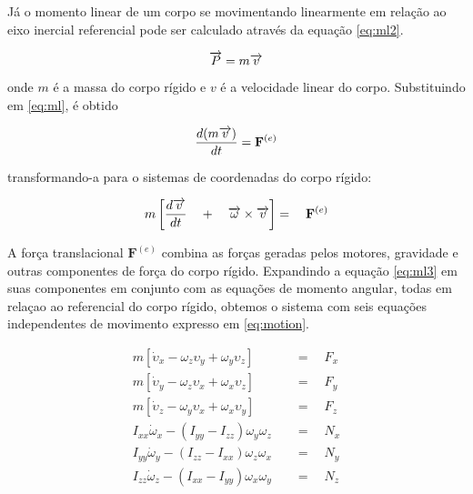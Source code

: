 \documentclass[a4paper, 12pt]{article}
\begin{document}
Já o momento linear de um corpo se movimentando linearmente em relação ao eixo inercial referencial pode ser calculado através da equação \ref{eq:ml2}.

\begin{equation}
\centering
\overrightarrow { P } = m\overrightarrow { v } 
\label{eq:ml2}
\end{equation}

\noindent onde $m$ é a massa do corpo rígido e $v$ é a velocidade linear do corpo. Substituindo em \ref{eq:ml}, é obtido 

\begin{equation}
\centering
\frac { d(m\overrightarrow { v } ) }{ dt } ={ \mathbf{F} }^{ (e) }
\label{eq:ml3}
\end{equation}

\noindent  transformando-a para o sistemas de coordenadas do corpo rígido:

\begin{equation}
\centering
m\left[ \frac { d\overrightarrow { v }  }{ dt } \quad +\quad \overrightarrow { \omega  } \times \overrightarrow { v }  \right] =\quad { \mathbf{F} }^{ (e) }
\label{eq:ml3}
\end{equation}

\noindent A força translacional $\mathbf{F}^{(e)}$ combina as forças geradas pelos motores, gravidade e outras componentes de força do corpo rígido. Expandindo a equação \ref{eq:ml3} em suas componentes em conjunto com as equações de momento angular, todas em relaçao ao referencial do corpo rígido, obtemos o sistema com seis equações independentes de movimento expresso em \ref{eq:motion}.

\begin{equation}
\begin{aligned}
	m\left[ { \dot { \upsilon  }  }_{ x } - { \omega  }_{ z }\upsilon_{ y } + { \omega  }_{ y }{ \upsilon  }_{ z } \right] \quad &=\quad { F }_{ x } \\ 
	m\left[ { \dot { \upsilon  }  }_{ y } - { \omega  }_{ z }\upsilon_{ x } + { \omega  }_{ x }{ \upsilon  }_{ z } \right] \quad &=\quad { F }_{ y } \\
	m\left[ { \dot { \upsilon  }  }_{ z } - { \omega  }_{ y }\upsilon_{ x } + { \omega  }_{ x }{ \upsilon  }_{ y } \right] \quad &=\quad { F }_{ z } \\ 
	{ I }_{ xx }{ \dot { \omega  }  }_{ x } - (I_{ yy } - I_{ zz }){ \omega  }_{ y }{ \omega  }_{ z }\quad &=\quad N_{ x } \\
	{ I }_{ yy }{ \dot { \omega  }  }_{ y } - (I_{ zz } - I_{ xx }){ \omega  }_{ z }{ \omega  }_{ x }\quad &=\quad N_{ y }\\
	{ I }_{ zz }{ \dot { \omega  }  }_{ z } - (I_{ xx } - I_{ yy }){ \omega  }_{ x }{ \omega  }_{ y }\quad &=\quad N_{ z }
\end{aligned}
\label{eq:motion}
\end{equation}
\end{document}

